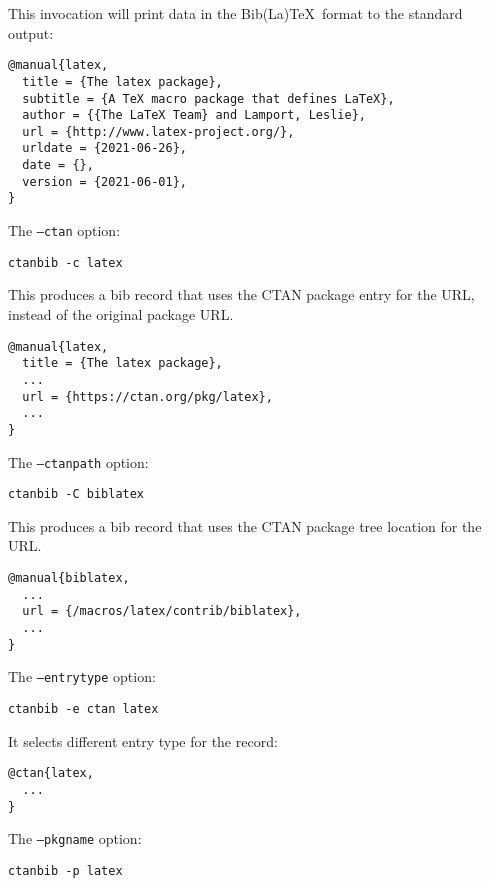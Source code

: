 \documentclass[11pt]{ltxdoc}
\begin{document}
\noindent This invocation will print data in the Bib(La)\TeX\ format to the standard output:

\begin{verbatim}
@manual{latex,
  title = {The latex package},
  subtitle = {A TeX macro package that defines LaTeX},
  author = {{The LaTeX Team} and Lamport, Leslie},
  url = {http://www.latex-project.org/},
  urldate = {2021-06-26},
  date = {},
  version = {2021-06-01},
}
\end{verbatim}

\noindent The \texttt{--ctan} option:

\begin{verbatim}
ctanbib -c latex
\end{verbatim}

\noindent This produces a bib record that uses the CTAN package entry for the URL, 
instead of the original package URL.


\begin{verbatim}
@manual{latex,
  title = {The latex package},
  ...
  url = {https://ctan.org/pkg/latex},
  ...
}
\end{verbatim}

\noindent The \texttt{--ctanpath} option:

\begin{verbatim}
ctanbib -C biblatex
\end{verbatim}

\noindent This produces a bib record that uses the CTAN package tree location for the URL.

\begin{verbatim}
@manual{biblatex,
  ...
  url = {/macros/latex/contrib/biblatex},
  ...
}
\end{verbatim}



\noindent The \texttt{--entrytype} option:

\begin{verbatim}
ctanbib -e ctan latex
\end{verbatim}

\noindent It selects different entry type for the record:

\begin{verbatim}
@ctan{latex,
  ...
}
\end{verbatim}

\noindent The \texttt{--pkgname} option:

\begin{verbatim}
ctanbib -p latex
\end{verbatim}
\end{document}
